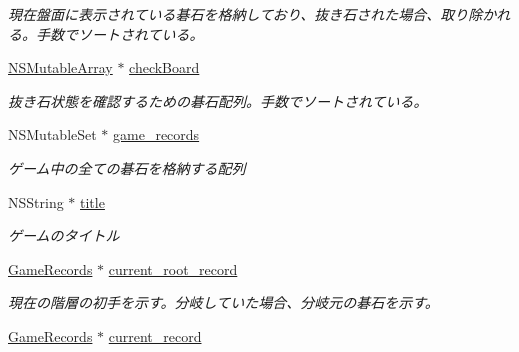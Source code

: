 \begin{DoxyCompactItemize}
\begin{DoxyCompactList}\small\item\em 現在盤面に表示されている碁石を格納しており、抜き石された場合、取り除かれる。手数でソートされている。 \end{DoxyCompactList}\item 
\hypertarget{interface_games_a6c4d48fdb1e411f0eeca709d3dc7eda7}{
\hyperlink{class_n_s_mutable_array}{NSMutableArray} $\ast$ \hyperlink{interface_games_a6c4d48fdb1e411f0eeca709d3dc7eda7}{checkBoard}}
\label{interface_games_a6c4d48fdb1e411f0eeca709d3dc7eda7}

\begin{DoxyCompactList}\small\item\em 抜き石状態を確認するための碁石配列。手数でソートされている。 \end{DoxyCompactList}\item 
\hypertarget{interface_games_aad355f00c1b6a1a5cf357bc8b43aaecb}{
NSMutableSet $\ast$ \hyperlink{interface_games_aad355f00c1b6a1a5cf357bc8b43aaecb}{game\_\-records}}
\label{interface_games_aad355f00c1b6a1a5cf357bc8b43aaecb}

\begin{DoxyCompactList}\small\item\em ゲーム中の全ての碁石を格納する配列 \end{DoxyCompactList}\item 
\hypertarget{interface_games_a129e05192a7c91baac3ac5e4d764dbbd}{
NSString $\ast$ \hyperlink{interface_games_a129e05192a7c91baac3ac5e4d764dbbd}{title}}
\label{interface_games_a129e05192a7c91baac3ac5e4d764dbbd}

\begin{DoxyCompactList}\small\item\em ゲームのタイトル \end{DoxyCompactList}\item 
\hypertarget{interface_games_ae761bedd4895d81eddf1dddf662db959}{
\hyperlink{interface_game_records}{GameRecords} $\ast$ \hyperlink{interface_games_ae761bedd4895d81eddf1dddf662db959}{current\_\-root\_\-record}}
\label{interface_games_ae761bedd4895d81eddf1dddf662db959}

\begin{DoxyCompactList}\small\item\em 現在の階層の初手を示す。分岐していた場合、分岐元の碁石を示す。 \end{DoxyCompactList}\item 
\hypertarget{interface_games_a799f4655d7b47e04445c82b1dbf9f4d6}{
\hyperlink{interface_game_records}{GameRecords} $\ast$ \hyperlink{interface_games_a799f4655d7b47e04445c82b1dbf9f4d6}{current\_\-record}}
\label{interface_games_a799f4655d7b47e04445c82b1dbf9f4d6}


\end{DoxyCompactItemize}
